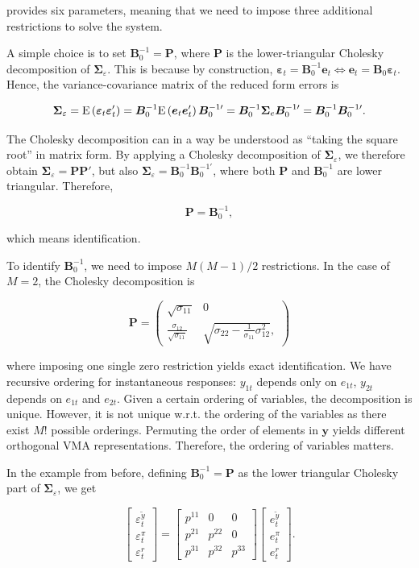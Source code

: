 provides six parameters, meaning that we need to impose three additional restrictions to solve the system. 

A simple choice is to set $\bm{B}_0^{-1} = \bm{P}$, where $\bm{P}$ is the lower-triangular Cholesky decomposition of $\bm{\Sigma}_\varepsilon$. This is because by construction, $\bm{\varepsilon}_t = \bm{B}_0^{-1}\bm{e}_t \Leftrightarrow \bm{e}_t = \bm{B}_0\bm{\varepsilon}_t$. Hence, the variance-covariance matrix of the reduced form errors is

\[
	\bm{\Sigma}_\varepsilon = \mathrm{E}\left({\bm{\varepsilon}_t\bm{\varepsilon}_t'}\right) = \bm{B}_0^{-1}\mathrm{E}\left({\bm{e}_t\bm{e}_t'}\right)\bm{B}_0^{-1\prime} = \bm{B}_0^{-1}\bm{\Sigma}_e\bm{B}_0^{-1\prime} = \bm{B}_0^{-1}\bm{B}_0^{-1\prime}.
\]

The Cholesky decomposition can in a way be understood as “taking the square root” in matrix form. By applying a Cholesky decomposition of $\bm{\Sigma}_\varepsilon$, we therefore obtain $\bm{\Sigma}_\varepsilon = \bm{PP}'$, but also $\bm{\Sigma}_\varepsilon = \bm{B}_0^{-1}\bm{B}_0^{-1\prime}$, where both $\bm{P}$ and $\bm{B}_0^{-1}$ are lower triangular. Therefore,

\[
	\bm{P} = \bm{B}_0^{-1},
\]

which means identification. 

To identify $\bm{B}_0^{-1}$, we need to impose $M(M-1)/2$ restrictions. In the case of $M=2$, the Cholesky decomposition is

\[
	\bm{P} = 
	\begin{pmatrix}
		\sqrt{\sigma_{11}} & 0 \\
		\frac{\sigma_{12}}{\sqrt{\sigma_{11}}} & \sqrt{\sigma_{22}-\frac{1}{\sigma_{11}}\sigma^2_{12}},
	\end{pmatrix}
\]

where imposing one single zero restriction yields exact identification. We have recursive ordering for instantaneous responses: $y_{1t}$ depends only on $e_{1t}$, $y_{2t}$ depends on $e_{1t}$ and $e_{2t}$. Given a certain ordering of variables, the decomposition is unique. However, it is not unique w.r.t. the ordering of the variables as there exist $M!$ possible orderings. Permuting the order of elements in $\bm{y}$ yields different orthogonal VMA representations. Therefore, the ordering of variables matters.

In the example from before, defining $\bm{B}_0^{-1} = \bm{P}$ as the lower triangular Cholesky part of $\bm{\Sigma}_\varepsilon$, we get

\[
 \begin{bmatrix}
 	\varepsilon_t^{\tilde{y}} \\
 	\varepsilon_t^\pi \\
 	\varepsilon_t^r
 \end{bmatrix}
 =
 \begin{bmatrix}
 	p^{11} & 0 & 0 \\
 	p^{21} & p^{22} & 0 \\
 	p^{31} & p^{32} & p^{33} 
 \end{bmatrix}
 \begin{bmatrix}
 	e_t^{\tilde{y}} \\
 	e_t^\pi \\
 	e_t^r
 \end{bmatrix}
 .
\]

